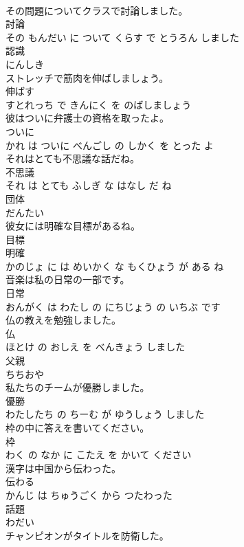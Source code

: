 \documentclass[8pt]{extreport}
\begin{document}
\begin{CJK}{UTF8}{min}
\\	その問題についてクラスで討論しました。	
\\	討論 
\\	その もんだい に ついて くらす で とうろん しました			
\\	認識	
\\	にんしき		
\\	ストレッチで筋肉を伸ばしましょう。	
\\	伸ばす 
\\	すとれっち で きんにく を のばしましょう			
\\	彼はついに弁護士の資格を取ったよ。	
\\	ついに 
\\	かれ は ついに べんごし の しかく を とった よ			
\\	それはとても不思議な話だね。	
\\	不思議 
\\	それ は とても ふしぎ な はなし だ ね			
\\	団体	
\\	だんたい		
\\	彼女には明確な目標があるね。	
\\	目標 
\\	明確 
\\	かのじょ に は めいかく な もくひょう が ある ね			
\\	音楽は私の日常の一部です。	
\\	日常 
\\	おんがく は わたし の にちじょう の いちぶ です			
\\	仏の教えを勉強しました。	
\\	仏 
\\	ほとけ の おしえ を べんきょう しました			
\\	父親	
\\	ちちおや		
\\	私たちのチームが優勝しました。	
\\	優勝 
\\	わたしたち の ちーむ が ゆうしょう しました			
\\	枠の中に答えを書いてください。	
\\	枠 
\\	わく の なか に こたえ を かいて ください			
\\	漢字は中国から伝わった。	
\\	伝わる 
\\	かんじ は ちゅうごく から つたわった			
\\	話題	
\\	わだい		
\\	チャンピオンがタイトルを防衛した。	

\end{CJK}
\end{document}
